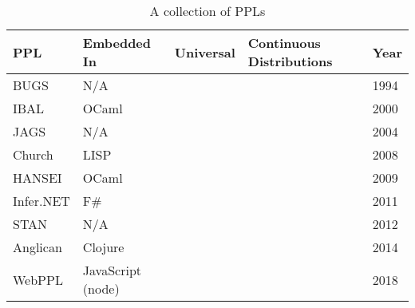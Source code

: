\begin{table}
	\centering
	\begin{tabular}{l|l|l|p{3cm}|l}
		\textbf{PPL}                       & \textbf{Embedded In} & \textbf{Universal} & \textbf{Continuous Distributions} & \textbf{Year} \\ \hline
		BUGS \cite{gilks1994bugs}          & N/A                  & \xmark             & \cmark                            & 1994          \\
		IBAL \cite{ibal}                   & OCaml                & \xmark             & \xmark                            & 2000          \\
		JAGS \cite{plummer2004jags}        & N/A                  & \xmark             & \cmark                            & 2004          \\
		Church \cite{goodman2012church}    & LISP                 & \cmark             & \cmark                            & 2008          \\
		HANSEI \cite{kiselyov2009embedded} & OCaml                & \xmark             & \xmark                            & 2009          \\
		Infer.NET \cite{wang2011using}     & F\#                  & \xmark             & \cmark                            & 2011          \\
		STAN \cite{carpenter2017stan}      & N/A                  & \xmark             & \cmark                            & 2012          \\
		Anglican \cite{anglican-smc}       & Clojure              & \cmark             & \cmark                            & 2014          \\
		WebPPL \cite{mobus2018structure}   & JavaScript (node)    & \cmark             & \cmark                            & 2018          \\
	\end{tabular}
	\caption{A collection of PPLs}
	\label{tab:ppl-summ}
\end{table}


